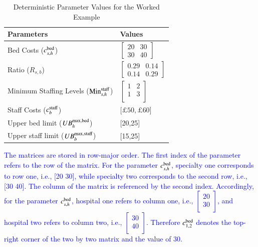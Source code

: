 \documentclass[../thesis.tex]{subfiles}
\begin{document}
{\begin{table}[h!]
    \centering
    \begin{tabular}{ll}\toprule
       \textbf{Parameters}  & \textbf{Values} \\\midrule
        Bed Costs ($c^\textnormal{bed}_{s,h}$) & $\begin{bmatrix} 20 & 30 \\ 30 & 40 \end{bmatrix}$\\ [0.5cm]
        Ratio ($R_{s,b}$) &$\begin{bmatrix}0.29&0.14\\ 
         0.14&0.29\end{bmatrix}$\\ [0.5cm]
         Minimum Staffing Levels ($\textnormal{Min}^\textnormal{staff}_{s,h}$) &$\begin{bmatrix}
         1&2 \\
         1&3\\
         \end{bmatrix}$\\ [0.5cm]
         Staff Costs ($c^\textnormal{staff}_{b}$) &[$\pounds50, \pounds60$] \\ [0.25cm]
        Upper bed limit ($UB^\textnormal{max,bed}_{h}$) &  [20,25]\\[0.25cm]
         Upper staff limit ($UB^\textnormal{max,staff}_{b}$)& [15,25]\\\bottomrule
    \end{tabular}
    \caption{Deterministic Parameter Values for the Worked Example}
    \label{tab:DeterministicWorkedExample}
\end{table}
\textcolor{blue}{The matrices are stored in row-major order. The first index of the parameter refers to the row of the matrix.  For the parameter $c^{\textnormal{bed}}_{s,h}$, specialty one corresponds to row one, i.e., [20 30], while specialty two corresponds to the second row, i.e., [30  40]. The column of the matrix is referenced by the second index. Accordingly, for the parameter $c^{\textnormal{bed}}_{s,h}$, hospital one refers to column one, i.e., \scriptsize{$\begin{bmatrix} 20 \\30\\\end{bmatrix}$}\normalsize, and hospital two refers to column two, i.e., \scriptsize{$\begin{bmatrix} 30 \\40\\\end{bmatrix}$}\normalsize. Therefore $c^{\textnormal{bed}}_{1,2}$ denotes the top-right corner of the two by two matrix and the value of 30.}


}
\end{document}
